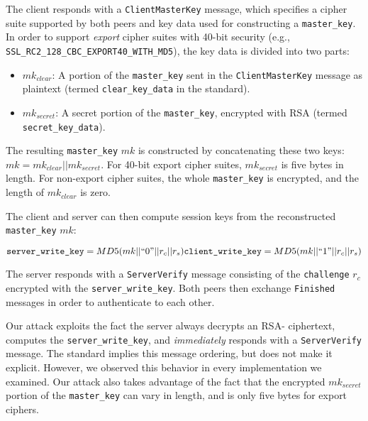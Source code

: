 The client responds with a \texttt{ClientMasterKey} message, which
specifies a cipher suite supported by both peers and key data
used for constructing a \texttt{master\_key}. In order to support
\textit{export} cipher suites with 40-bit security (e.g.,
\texttt{SSL\_RC2\_128\_CBC\_EXPORT40\_WITH\_MD5}), the key data is
divided into two parts:
\begin{itemize}
	\item $mk_{clear}$: A portion of the \texttt{master\_key} sent in the \texttt{ClientMasterKey} message as plaintext (termed \texttt{clear\_key\_data} in the \ssltwo standard).
	\item $mk_{secret}$: A secret portion of the
          \texttt{master\_key}, encrypted with RSA \PKCS (termed \texttt{secret\_key\_data}). 
\end{itemize}
The resulting \texttt{master\_key} $mk$ is constructed by
concatenating these two keys: $mk = mk_{clear} || mk_{secret}$. For
40-bit export cipher suites, $mk_{secret}$ is five bytes in length.
For non-export cipher suites, the whole \texttt{master\_key} is
encrypted, and the length of $mk_{clear}$ is zero.

The client and server can then compute session keys from the reconstructed \texttt{master\_key} $mk$:

\begin{center}
\begin{math}
	\texttt{server\_write\_key} = MD5(mk || ``0" || r_c || r_s) \linebreak	
	\texttt{client\_write\_key} = MD5(mk || ``1" || r_c || r_s)
\end{math}
\end{center}

The server responds with a \texttt{ServerVerify} message
consisting of the \texttt{challenge} $r_c$ encrypted with the
\texttt{server\_write\_key}.  Both peers then exchange
\texttt{Finished} messages in order to authenticate to each other.

Our attack exploits the fact the server always decrypts an RSA-\PKCS
ciphertext, computes the \texttt{server\_write\_key}, and \textit{immediately}
responds with a \texttt{ServerVerify} message.  The \ssltwo standard
implies this message ordering, but does not make it explicit.
However, we observed this behavior in every implementation we
examined.  Our attack also takes advantage of the fact that the
encrypted $mk_{secret}$ portion of the \texttt{master\_key} can vary
in length, and is only five bytes for export ciphers.

